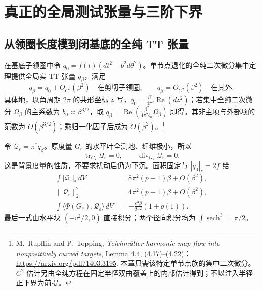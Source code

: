 \documentclass[UTF8,fontset=fandol,zihao=-4,oneside,openany]{ctexbook}
\theoremstyle{cjkplain}
\numberwithin{equation}{chapter}
\begin{document}
\section{真正的全局测试张量与三阶下界}
\label{BUN:global-obstruction}

\subsection{从领圈长度模到闭基底的全纯 TT 张量}
在基底子领圈中令 $q_0=f(t)(dt^2-b^2d\theta^2)$。单节点退化的全纯二次微分集中定理提供全局实 TT 张量 $q_\beta$，满足
\begin{equation}
 q_\beta=q_0+O_{C^2}(\beta^2)\quad\text{在剪切子领圈},
 \qquad q_\beta=O_{C^2}(\beta^2)\quad\text{在其外}.
 \label{BUN:global-q}
\end{equation}
具体地，以角周期 $2\pi$ 的共形坐标 $z$ 写，$q_0=\frac{\beta^2}{4\pi^2}\operatorname{Re}(dz^2)$；若集中全纯二次微分 $\Omega_\beta$ 的主系数为 $b_0\asymp\beta^{3/2}$，取
$q_\beta=\operatorname{Re}(\frac{\beta^2}{4\pi^2b_0}\Omega_\beta)$ 即得。其非主项与外部项的范数为 $O(\beta^{3/2})$；乘归一化因子后成为 $O(\beta^2)$。\footnote{M.~Rupflin and P.~Topping, \emph{Teichmüller harmonic map flow into nonpositively curved targets}, Lemma 4.4, (4.17)--(4.22)：\url{https://arxiv.org/pdf/1403.3195}. 本章只需该特定单节点族的集中二次微分。$C^2$ 估计另由全纯方程在固定半径双曲覆盖上的内部估计得到；不以注入半径正下界为前提。}

令 $\mathcal Q_\varepsilon=\pi^*q_\beta$。原度量 $G_\varepsilon$ 的水平叶全测地、纤维极小，所以
\[
 \operatorname{tr}_{G_\varepsilon}\mathcal Q_\varepsilon=0,
 \qquad\operatorname{div}_{G_\varepsilon}\mathcal Q_\varepsilon=0.
\]
这是背景度量的性质，不要求扰动后仍为下沉。面积固定与 $|q_0|_*=2f$ 给
\begin{equation}
 \begin{aligned}
 \int|\mathcal Q_\varepsilon|_*\,dV&=8\pi^2(p-1)\beta+O(\beta^2),\\
 \|\mathcal Q_\varepsilon\|_2^2&=4\pi^2(p-1)\beta+O(\beta^2),\\
 \int\langle\Phi(G_\varepsilon),\mathcal Q_\varepsilon\rangle\,dV
 &=-\frac{\varepsilon^3\beta}{2\pi^2}(1+o(1)).
 \end{aligned}
 \label{BUN:global-pairings}
\end{equation}
最后一式由水平块 $(-v^2/2,0)$ 直接积分；两个径向积分均为 $\int\operatorname{sech}^3=\pi/2$。
\end{document}
